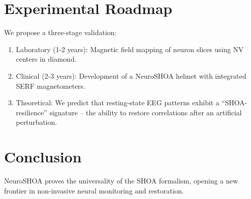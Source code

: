 \documentclass[12pt]{article}
\begin{document}
\section{Experimental Roadmap}
We propose a three-stage validation:
\begin{enumerate}
    \item Laboratory (1-2 years): Magnetic field mapping of neuron slices using NV centers in diamond.
    \item Clinical (2-3 years): Development of a NeuroSHOA helmet with integrated SERF magnetometers.
    \item Theoretical: We predict that resting-state EEG patterns exhibit a ``SHOA-resilience'' signature -- the ability to restore correlations after an artificial perturbation.
\end{enumerate}

\section{Conclusion}
NeuroSHOA proves the universality of the SHOA formalism, opening a new frontier in non-invasive neural monitoring and restoration.
\end{document}
